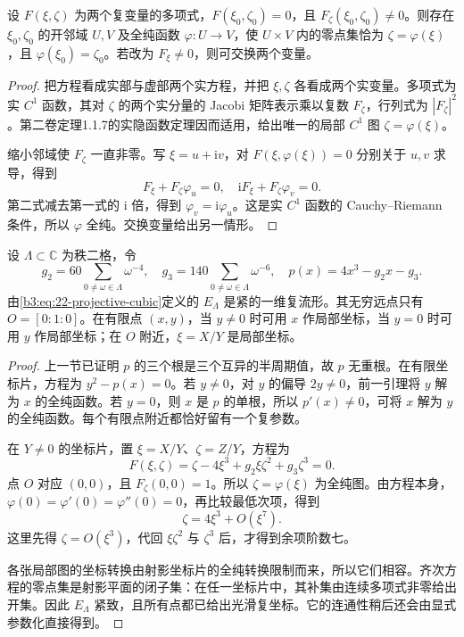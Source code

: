\begin{lemma}[复多项式的局部隐函数]\label{b3:lem:22-polynomial-implicit}
设 \(F(\xi,\zeta)\) 为两个复变量的多项式，\(F(\xi_0,\zeta_0)=0\)，且 \(F_\zeta(\xi_0,\zeta_0)\ne0\)。则存在 \(\xi_0,\zeta_0\) 的开邻域 \(U,V\) 及全纯函数 \(\varphi:U\to V\)，使 \(U\times V\) 内的零点集恰为 \(\zeta=\varphi(\xi)\)，且 \(\varphi(\xi_0)=\zeta_0\)。若改为 \(F_\xi\ne0\)，则可交换两个变量。
\end{lemma}
\begin{proof}
把方程看成实部与虚部两个实方程，并把 \(\xi,\zeta\) 各看成两个实变量。多项式为实 \(C^1\) 函数，其对 \(\zeta\) 的两个实分量的 Jacobi 矩阵表示乘以复数 \(F_\zeta\)，行列式为 \(|F_\zeta|^2\)。第二卷定理1.1.7的实隐函数定理因而适用，给出唯一的局部 \(C^1\) 图 \(\zeta=\varphi(\xi)\)。

缩小邻域使 \(F_\zeta\) 一直非零。写 \(\xi=u+\mathrm iv\)，对 \(F(\xi,\varphi(\xi))=0\) 分别关于 \(u,v\) 求导，得到
\[
 F_\xi+F_\zeta\varphi_u=0,\quad
 \mathrm iF_\xi+F_\zeta\varphi_v=0.
\]
第二式减去第一式的 \(\mathrm i\) 倍，得到 \(\varphi_v=\mathrm i\varphi_u\)。这是实 \(C^1\) 函数的 Cauchy--Riemann 条件，所以 \(\varphi\) 全纯。交换变量给出另一情形。
\end{proof}

\begin{proposition}[格所确定的光滑三次曲线]\label{b3:prop:22-smooth-cubic}
设 \(\Lambda\subset\mathbb C\) 为秩二格，令
\[
 g_2=60\sum_{0\ne\omega\in\Lambda}\omega^{-4},\quad
 g_3=140\sum_{0\ne\omega\in\Lambda}\omega^{-6},\quad
 p(x)=4x^3-g_2x-g_3.
\]
由\eqref{b3:eq:22-projective-cubic}定义的 \(E_\Lambda\) 是紧的一维复流形。其无穷远点只有 \(O=[0:1:0]\)。在有限点 \((x,y)\)，当 \(y\ne0\) 时可用 \(x\) 作局部坐标，当 \(y=0\) 时可用 \(y\) 作局部坐标；在 \(O\) 附近，\(\xi=X/Y\) 是局部坐标。
\end{proposition}
\begin{proof}
上一节已证明 \(p\) 的三个根是三个互异的半周期值，故 \(p\) 无重根。在有限坐标片，方程为 \(y^2-p(x)=0\)。若 \(y\ne0\)，对 \(y\) 的偏导 \(2y\ne0\)，前一引理将 \(y\) 解为 \(x\) 的全纯函数。若 \(y=0\)，则 \(x\) 是 \(p\) 的单根，所以 \(p'(x)\ne0\)，可将 \(x\) 解为 \(y\) 的全纯函数。每个有限点附近都恰好留有一个复参数。

在 \(Y\ne0\) 的坐标片，置 \(\xi=X/Y\)、\(\zeta=Z/Y\)，方程为
\[
 F(\xi,\zeta)=\zeta-4\xi^3+g_2\xi\zeta^2+g_3\zeta^3=0.
\]
点 \(O\) 对应 \((0,0)\)，且 \(F_\zeta(0,0)=1\)。所以 \(\zeta=\varphi(\xi)\) 为全纯图。由方程本身，\(\varphi(0)=\varphi'(0)=\varphi''(0)=0\)，再比较最低次项，得到
\begin{equation}\label{b3:eq:22-infinity-chart}
 \zeta=4\xi^3+O(\xi^7).
\end{equation}
这里先得 \(\zeta=O(\xi^3)\)，代回 \(\xi\zeta^2\) 与 \(\zeta^3\) 后，才得到余项阶数七。

各张局部图的坐标转换由射影坐标片的全纯转换限制而来，所以它们相容。齐次方程的零点集是射影平面的闭子集：在任一坐标片中，其补集由连续多项式非零给出开集。因此 \(E_\Lambda\) 紧致，且所有点都已给出光滑复坐标。它的连通性稍后还会由显式参数化直接得到。
\end{proof}

